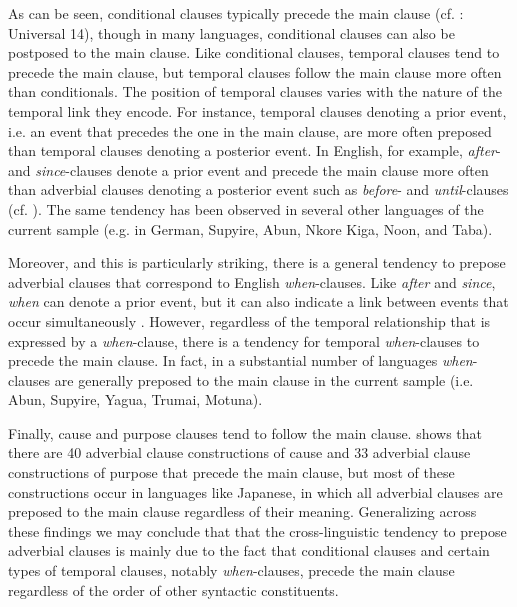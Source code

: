 \documentclass[output=paper]{langsci/langscibook}
\begin{document}
As can be seen, conditional clauses typically precede the main clause (cf. \citealt{Greenberg1963}: Universal 14), though in many languages, conditional clauses can also be postposed to the main clause. Like conditional clauses, temporal clauses tend to precede the main clause, but temporal clauses follow the main clause more often than conditionals. The position of temporal clauses varies with the nature of the temporal link they encode. For instance, temporal clauses denoting a prior event, i.e. an event that precedes the one in the main clause, are more often preposed than temporal clauses denoting a posterior event. In English, for example, \textit{after}- and \textit{since}-clauses denote a prior event and precede the main clause more often than adverbial clauses denoting a posterior event such as \textit{before}- and \textit{until}-clauses (cf. \citealt{Diessel2008}). The same tendency has been observed in several other languages of the current sample (e.g. in German, Supyire, Abun, Nkore Kiga, Noon, and Taba). 

Moreover, and this is particularly striking, there is a general tendency to prepose adverbial clauses that correspond to English \textit{when}-clauses. Like \textit{after} and \textit{since}, \textit{when} can denote a prior event, but it can also indicate a link between events that occur simultaneously \citep{Diessel2008}. However, regardless of the temporal relationship that is expressed by a \textit{when}-clause, there is a tendency for temporal \textit{when}-clauses to precede the main clause. In fact, in a substantial number of languages \textit{when}-clauses are generally preposed to the main clause in the current sample (i.e. Abun, Supyire, Yagua, Trumai, Motuna). 

Finally, cause and purpose clauses tend to follow the main clause.  shows that there are 40 adverbial clause constructions of cause and 33 adverbial clause constructions of purpose that precede the main clause, but most of these constructions occur in languages like Japanese, in which all adverbial clauses are preposed to the main clause regardless of their meaning. Generalizing across these findings we may conclude that that the cross-linguistic tendency to prepose adverbial clauses is mainly due to the fact that conditional clauses and certain types of temporal clauses, notably \textit{when}-clauses, precede the main clause regardless of the order of other syntactic constituents.
\end{document}
